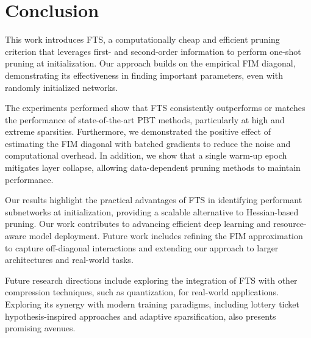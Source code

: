 \section{Conclusion}
\label{sec:conclusion}
This work introduces FTS, a computationally cheap and efficient pruning criterion that leverages first- and second-order information to perform one-shot pruning at initialization. Our approach builds on the empirical FIM diagonal, demonstrating its effectiveness in finding important parameters, even with randomly initialized networks. 

The experiments performed show that FTS consistently outperforms or matches the performance of state-of-the-art PBT methods, particularly at high and extreme sparsities. Furthermore, we demonstrated the positive effect of estimating the FIM diagonal with batched gradients to reduce the noise and computational overhead. In addition, we show that a single warm-up epoch mitigates layer collapse, allowing data-dependent pruning methods to maintain performance. 

Our results highlight the practical advantages of FTS in identifying performant subnetworks at initialization, providing a scalable alternative to Hessian-based pruning. Our work contributes to advancing efficient deep learning and resource-aware model deployment. Future work includes refining the FIM approximation to capture off-diagonal interactions and extending our approach to larger architectures and real-world tasks.

Future research directions include exploring the integration of FTS with other compression techniques, such as quantization, for real-world applications. Exploring its synergy with modern training paradigms, including lottery ticket hypothesis-inspired approaches and adaptive sparsification, also presents promising avenues.

